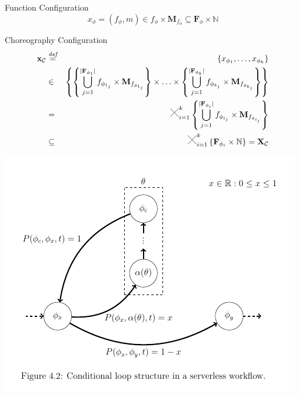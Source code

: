 \documentclass[13.5pt]{beamer}
\newcommand{\Cross}{\mathbin{\tikz [x=2.5ex,y=2.5ex,line width=.10ex] \draw (0,0) -- (1,1) (0,1) -- (1,0);}}
\newcommand{\mathDef}{\overset{\textit{def}}{=}}
\newcommand{\N}{\mathbb{N}}
\begin{document}
\begin{frame}[noframenumbering]
	\begin{block}{Function Configuration}
\begin{equation}
	x_{\phi} = (f_{\phi},m) \in f_{\phi} \times \textbf{M}_{f_{\phi}} \subseteq \textbf{F}_{\phi} \times \N
\end{equation}
\end{block}

\begin{block}{Choreography Configuration}
\begin{eqnarray}
	\textbf{x}_{\mathcal{C}} & \mathDef & \left\lbrace x_{\phi_{1}}, \ldots, x_{\phi_{k}} \right\rbrace \nonumber \\ 
	& \in & \left\{  \left\{ \bigcup_{j=1}^{|\textbf{F}_{\phi_{1}}|} f_{\phi_{1_j}} \times \textbf{M}_{f_{\phi_{1_j}}} \right\} \times \ldots \times \left\{ \bigcup_{j=1}^{|\textbf{F}_{\phi_{k}}|} f_{\phi_{k_j}} \times \textbf{M}_{f_{\phi_{k_j}}} \right\} \right\}  \nonumber \\
	& = & \Cross_{i = 1}^k \left\{ \bigcup_{j=1}^{|\textbf{F}_{\phi_{i}}|} f_{\phi_{i_j}} \times \textbf{M}_{f_{\phi_{i_j}}} \right\} \nonumber \\
	& \subseteq & \Cross_{i = 1}^k \left\{ \textbf{F}_{\phi_{i}} \times \mathbb{N} \right\} = \textbf{X}_{\mathcal{C}}
\end{eqnarray}


\end{block}
\end{frame} 

\begin{frame}[noframenumbering]
	
	\begin{center}
		\includegraphics[width=\textwidth,height=0.95\textheight]{../Images/super1.png}
	\end{center}
	
\end{frame} 
\end{document}
